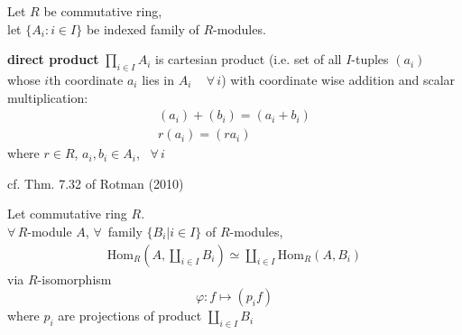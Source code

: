 \begin{definition}
	Let $R$ be commutative ring, \\
	let $\lbrace A_i : i \in I \rbrace$ be indexed family of $R$-modules.  
	
	\textbf{direct product} $\prod_{i\in I} A_i$ is cartesian product (i.e. set of all $I$-tuples $(a_i)$ whose $i$th coordinate $a_i$ lies in $A_i \quad \, \forall \, i$) with coordinate wise addition and scalar multiplication: 
	\[
	\begin{gathered}
	(a_i) + (b_i) = (a_i + b_i) \\
	r(a_i) = (ra_i)
	\end{gathered}
	\]
	where $r\in R$, $a_i, b_i \in A_i$, \, $\forall \, i $  
\end{definition}




cf. Thm. 7.32 of Rotman (2010) \cite{agat:JRotman2010}
\begin{theorem}[7.32, Rotman]
	Let commutative ring $R$.  \\
	$\forall \, R$-module $A$, $\forall \,$ family $\lbrace B_i | i \in I \rbrace$ of $R$-modules,
	\begin{equation}
	\begin{gathered}
	\text{Hom}_R(A, \coprod_{i\in I} B_i ) \simeq \coprod_{i \in I} \text{Hom}_R(A,B_i)
	\end{gathered}
	\end{equation}
	via $R$-isomorphism
	\[
	\varphi : f\mapsto (p_if)
	\]
	where $p_i $ are projections of product $\coprod_{i\in I }B_i$
\end{theorem}

